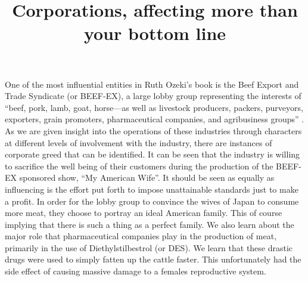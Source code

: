 \documentclass{article}
\title{Corporations, affecting more than your bottom line}
\begin{document}
\makeheader

One of the most influential entities in Ruth Ozeki's book
 is the Beef Export and Trade Syndicate (or BEEF-EX),
a large lobby group representing the interests of ``beef, pork, lamb, goat,
horse—as well as livestock producers, packers, purveyors, exporters, grain
promoters, pharmaceutical companies, and agribusiness groups''
\cite{ozeki1998my}. As we are given insight into the operations of these
industries through characters at different levels of involvement with the
industry, there are instances of corporate greed that can be identified. It
can be seen that the industry is willing to sacrifice the well being of
their customers during the production of the BEEF-EX sponsored show, ``My
American Wife''. It should be seen as equally as influencing is the effort
put forth to impose unattainable standards just to make a profit. In order
for the lobby group to convince the wives of Japan to consume more meat,
they choose to portray an ideal American family. This of course implying
that there is such a thing as a perfect family. We also learn about the
major role that pharmaceutical companies play in the production of meat,
primarily in the use of Diethylstilbestrol (or DES). We learn that these
drastic drugs were used to simply fatten up the cattle faster. This
unfortunately had the side effect of causing massive damage to a females
reproductive system.

\end{document}

